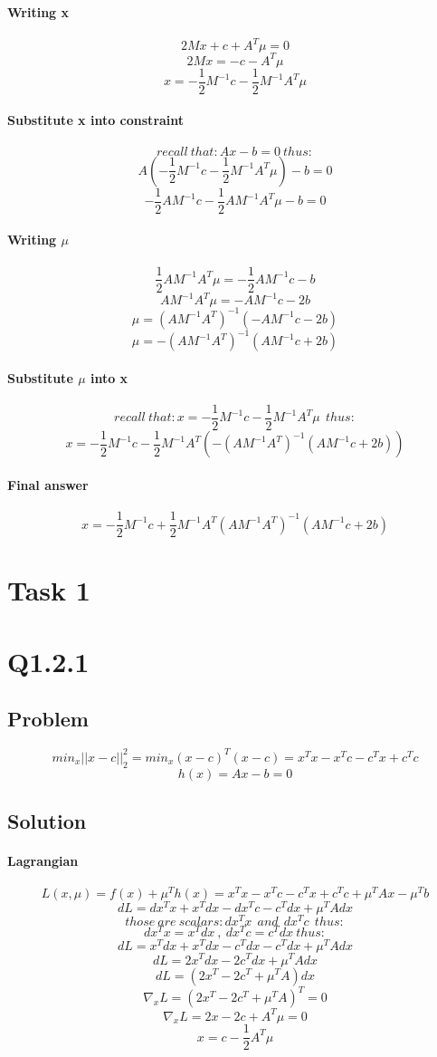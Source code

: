 \documentclass[12pt]{article}
\begin{document}
\paragraph{Writing x}
\[2Mx + c + A^T \mu = 0 \]
\[2Mx = - c - A^T \mu\]
\[x = - \frac{1}{2} M^{-1}c - \frac{1}{2} M^{-1}A^T \mu\]
\paragraph{Substitute x into constraint}
\[recall\  that: Ax - b = 0\ thus:\]
\[A(- \frac{1}{2} M^{-1}c - \frac{1}{2} M^{-1}A^T \mu) - b = 0 \]
\[- \frac{1}{2} AM^{-1}c - \frac{1}{2} AM^{-1}A^T \mu - b = 0 \]
\paragraph{Writing $\mu$}
\[\frac{1}{2} AM^{-1}A^T \mu = - \frac{1}{2} AM^{-1}c - b \]
\[AM^{-1}A^T \mu = - AM^{-1}c - 2b \]
\[ \mu = (AM^{-1}A^T)^{-1}(- AM^{-1}c - 2b)\]
\[ \mu = -(AM^{-1}A^T)^{-1}(AM^{-1}c + 2b)\]
\paragraph{Substitute $\mu$ into x}
\[recall\  that: x = - \frac{1}{2} M^{-1}c - \frac{1}{2} M^{-1}A^T \mu \ \ thus:\]
\[x = - \frac{1}{2} M^{-1}c - \frac{1}{2} M^{-1}A^T (-(AM^{-1}A^T)^{-1}(AM^{-1}c + 2b))\]
\paragraph{Final answer}
\[x = - \frac{1}{2} M^{-1}c + \frac{1}{2} M^{-1}A^T (AM^{-1}A^T)^{-1}(AM^{-1}c + 2b)\]

\newpage
\section{Task 1}
\section{Q1.2.1}
\subsection{Problem}
\[min_x ||x-c||_2 ^2 = min_x (x-c)^T (x-c) = x^T x - x^T c - c^T x + c^T c\]
\[h(x)= Ax -b = 0 \]
\subsection{Solution}
\paragraph{Lagrangian}
\[L(x,\mu)=f(x) + \mu ^T h(x) = x^T x - x^T c - c^T x + c^T c + \mu ^T Ax - \mu ^T b\]
\[dL = dx^T x + x^T dx - dx^T c - c^T dx + \mu ^T Adx \]
\[those \ are \ scalars: dx^T x \ \ and \ \ dx^T c \ \ thus: \]
\[dx^T x = x^T dx \ , \ dx^T c = c^T dx \ thus: \]
\[dL = x^T dx + x^T dx - c^T dx - c^T dx + \mu ^T Adx \]
\[dL = 2x^T dx - 2c^T dx + \mu ^T Adx \]
\[dL = (2x^T - 2c^T + \mu ^T A)dx \]
\[\nabla_x L = (2x^T - 2c^T + \mu ^T A)^T = 0 \]
\[\nabla_x L = 2x - 2c + A^T \mu = 0 \]
\[x= c - \frac{1}{2} A^T \mu \]
\end{document}
